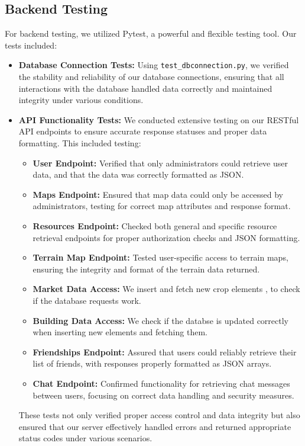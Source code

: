 \documentclass[12pt]{article}
\begin{document}
\subsection{Backend Testing}
For backend testing, we utilized Pytest, a powerful and flexible testing tool. Our tests included:
\begin{itemize}
    \item \textbf{Database Connection Tests:} Using \texttt{test\_dbconnection.py}, we verified the stability and reliability of our database connections, ensuring that all interactions with the database handled data correctly and maintained integrity under various conditions.
    \item \textbf{API Functionality Tests:} We conducted extensive testing on our RESTful API endpoints to ensure accurate response statuses and proper data formatting. This included testing:
        \begin{itemize}
            \item \textbf{User Endpoint:} Verified that only administrators could retrieve user data, and that the data was correctly formatted as JSON.
            \item \textbf{Maps Endpoint:} Ensured that map data could only be accessed by administrators, testing for correct map attributes and response format.
            \item \textbf{Resources Endpoint:} Checked both general and specific resource retrieval endpoints for proper authorization checks and JSON formatting.
            \item \textbf{Terrain Map Endpoint:} Tested user-specific access to terrain maps, ensuring the integrity and format of the terrain data returned.
            \item \textbf{Market Data Access:} We insert and fetch new crop elements , to check if the database requests work.
            \item \textbf{Building Data Access:} We check if the databse is updated correctly when inserting new elements and fetching them.
            \item \textbf{Friendships Endpoint:} Assured that users could reliably retrieve their list of friends, with responses properly formatted as JSON arrays.
            \item \textbf{Chat Endpoint:} Confirmed functionality for retrieving chat messages between users, focusing on correct data handling and security measures.
        \end{itemize}
    These tests not only verified proper access control and data integrity but also ensured that our server effectively handled errors and returned appropriate status codes under various scenarios.

\end{itemize}
\end{document}
